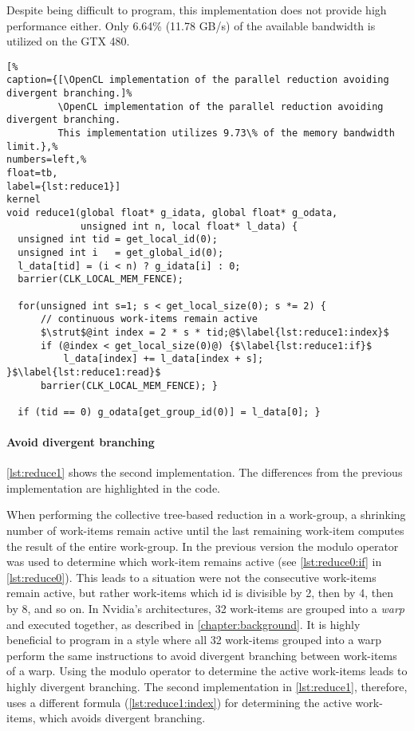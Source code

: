 Despite being difficult to program, this implementation does not provide high performance either.
Only 6.64\% (11.78 GB/s) of the available bandwidth is utilized on the GTX 480.

\begin{lstlisting}[%
caption={[\OpenCL implementation of the parallel reduction avoiding divergent branching.]%
         \OpenCL implementation of the parallel reduction avoiding divergent branching.
         This implementation utilizes 9.73\% of the memory bandwidth limit.},%
numbers=left,%
float=tb,
label={lst:reduce1}]
kernel
void reduce1(global float* g_idata, global float* g_odata,
             unsigned int n, local float* l_data) {
  unsigned int tid = get_local_id(0);
  unsigned int i   = get_global_id(0);
  l_data[tid] = (i < n) ? g_idata[i] : 0;
  barrier(CLK_LOCAL_MEM_FENCE);

  for(unsigned int s=1; s < get_local_size(0); s *= 2) {
      // continuous work-items remain active
      $\strut$@int index = 2 * s * tid;@$\label{lst:reduce1:index}$
      if (@index < get_local_size(0)@) {$\label{lst:reduce1:if}$
          l_data[index] += l_data[index + s]; }$\label{lst:reduce1:read}$
      barrier(CLK_LOCAL_MEM_FENCE); }

  if (tid == 0) g_odata[get_group_id(0)] = l_data[0]; }
\end{lstlisting}

\paragraph{Avoid divergent branching}

\autoref{lst:reduce1} shows the second implementation.
The differences from the previous implementation are highlighted in the code.

When performing the collective tree-based reduction in a work-group, a shrinking number of work-items remain active until the last remaining work-item computes the result of the entire work-group.
In the previous version the modulo operator was used to determine which work-item remains active (see \autoref{lst:reduce0:if} in \autoref{lst:reduce0}).
This leads to a situation were not the consecutive work-items remain active, but rather work-items which id is divisible by 2, then by 4, then by 8, and so on.
In Nvidia's \GPU architectures, 32 work-items are grouped into a \emph{warp} and executed together, as described in \autoref{chapter:background}.
It is highly beneficial to program in a style where all 32 work-items grouped into a warp perform the same instructions to avoid divergent branching between work-items of a warp.
Using the modulo operator to determine the active work-items leads to highly divergent branching.
The second implementation in \autoref{lst:reduce1}, therefore, uses a different formula (\autoref{lst:reduce1:index}) for determining the active work-items, which avoids divergent branching.

